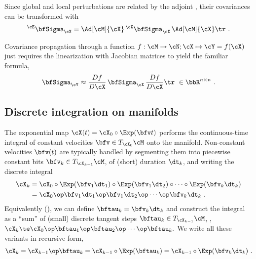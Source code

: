 Since global and local perturbations are related by the adjoint , their covariances can be transformed with 
%
\begin{align}
^\cE\bfSigma_{\cX} = \Ad[\cM]{\cX} \, ^\cX\bfSigma_{\cX} \, \Ad[\cM]{\cX}\tr
~.
\end{align}

Covariance propagation through a function $f:\cM\to\cN;\cX\mapsto \cY=f(\cX)$ just requires the linearization  with Jacobian matrices  to yield the familiar formula,
%
\begin{align}\label{equ:cov_propagation}
\bfSigma_{\cY} \approx \ndpar{f}{\cX} \, \bfSigma_\cX \, \ndpar{f}{\cX}\tr
~\in\bbR^{n\times n}
~.
\end{align}



\subsection{Discrete integration on manifolds}

The exponential map $\cX(t)=\cX_0\circ\Exp(\bfv t)$ performs the continuous-time integral of constant velocities $\bfv\in\mtanat{\cM}{\cX_0}$ onto the manifold.
Non-constant velocities $\bfv(t)$ are typically handled by segmenting them into piecewise constant bits $\bfv_k\in\mtanat{\cM}{\cX_{k-1}}$, of (short) duration $\dt_k$, and writing the discrete integral
%
\begin{align*}
\cX_k &= \cX_0\circ\Exp(\bfv_1 \dt_1)\circ\Exp(\bfv_1 \dt_2)\circ\cdots\circ\Exp(\bfv_k \dt_k) \\
 &= \cX_0 \op \bfv_1 \dt_1\op\bfv_1 \dt_2\op\cdots\op\bfv_k \dt_k
~.
\end{align*}
%
Equivalently (), we can define $\bftau_k=\bfv_k\dt_k$ and  
construct the integral as a ``sum'' of (small) discrete tangent steps $\bftau_k\in\mtanat{\cM}{\cX_{k-1}}$, \ie,
%
$
\cX_k \te \cX_0\op\bftau_1\op\bftau_2\op\cdots\op\bftau_k.
$
%
We write all these variants in recursive form,
%
\begin{align}\label{equ:int_recursive}
\cX_k = \cX_{k-1}\op\bftau_k = \cX_{k-1}\circ\Exp(\bftau_k) = \cX_{k-1}\circ\Exp(\bfv_k\dt_k)
~.
\end{align}
%

